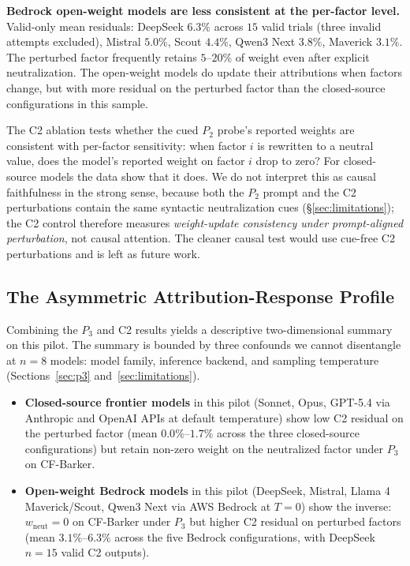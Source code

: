 \documentclass[11pt]{article}
\begin{document}
\textbf{Bedrock open-weight models are less consistent at the per-factor level.} Valid-only mean residuals: DeepSeek $6.3\%$ across $15$ valid trials (three invalid attempts excluded), Mistral $5.0\%$, Scout $4.4\%$, Qwen3 Next $3.8\%$, Maverick $3.1\%$. The perturbed factor frequently retains $5$--$20\%$ of weight even after explicit neutralization. The open-weight models do update their attributions when factors change, but with more residual on the perturbed factor than the closed-source configurations in this sample.

The C2 ablation tests whether the cued $P_2$ probe's reported weights are consistent with per-factor sensitivity: when factor $i$ is rewritten to a neutral value, does the model's reported weight on factor $i$ drop to zero? For closed-source models the data show that it does. We do not interpret this as causal faithfulness in the strong sense, because both the $P_2$ prompt and the C2 perturbations contain the same syntactic neutralization cues (\S\ref{sec:limitations}); the C2 control therefore measures \emph{weight-update consistency under prompt-aligned perturbation}, not causal attention. The cleaner causal test would use cue-free C2 perturbations and is left as future work.

\subsection{The Asymmetric Attribution-Response Profile}

Combining the $P_3$ and C2 results yields a descriptive two-dimensional summary on this pilot. The summary is bounded by three confounds we cannot disentangle at $n = 8$ models: model family, inference backend, and sampling temperature (Sections~\ref{sec:p3} and~\ref{sec:limitations}).

\begin{itemize}
\item \textbf{Closed-source frontier models} in this pilot (Sonnet, Opus, GPT-5.4 via Anthropic and OpenAI APIs at default temperature) show low C2 residual on the perturbed factor (mean $0.0\%$--$1.7\%$ across the three closed-source configurations) but retain non-zero weight on the neutralized factor under $P_3$ on CF-Barker.
\item \textbf{Open-weight Bedrock models} in this pilot (DeepSeek, Mistral, Llama 4 Maverick/Scout, Qwen3 Next via AWS Bedrock at $T = 0$) show the inverse: $w_{\text{neut}} = 0$ on CF-Barker under $P_3$ but higher C2 residual on perturbed factors (mean $3.1\%$--$6.3\%$ across the five Bedrock configurations, with DeepSeek $n=15$ valid C2 outputs).
\end{itemize}
\end{document}
